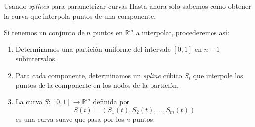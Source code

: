 \begin{frame}{Usando \textit{splines} para parametrizar curvas}
  Hasta ahora solo sabemos como obtener la curva que interpola
  puntos de \alert{una componente}.

  \pause

  Si tenemos un conjunto de $n$ puntos en $\mathbb{R}^m$ a interpolar,
  procederemos así:
  \begin{enumerate}[<+->]
    \item Determinamos una partición uniforme del intervalo $[0, 1]$ en
    $n - 1$ subintervalos.
    \item Para cada componente, determinamos un \textit{spline} cúbico
    $S_i$ que interpole los puntos de la componente en los nodos de la
    partición.
    \item La curva $S: [0, 1] \longrightarrow \mathbb{R}^m$ definida por
    \[
      S(t) = \left(S_1(t), S_2(t), \ldots, S_m(t)\right)
    \]
    es una curva suave que pasa por los $n$ puntos.
  \end{enumerate}
\end{frame}
